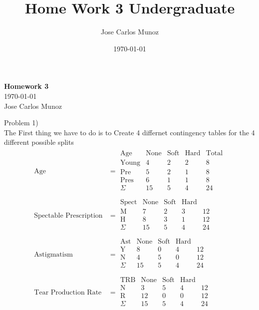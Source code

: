 \documentclass[12pt,english]{article}
\title{Home Work 3 Undergraduate}
\date{\today}
\author{Jose Carlos Munoz}
\begin{document}
\begin{center}
    \Large
    \textbf{Homework 3}\\
    \small
    \today\\
    \large
    Jose Carlos Munoz
\end{center}%
\par
Problem 1)\\
The First thing we have to do is to Create 4 differnet contingency tables for the 4 different possible splits
\begin{equation}\tag{1}\label{eq:1}
\begin{split}
\mbox{Age} &= 
\begin{array}{c|ccc|c}
\mbox{Age}   & \mbox{None} & \mbox{Soft} & \mbox{Hard} & \mbox{Total}\\
\hline
\mbox{Young} & 4           & 2           & 2           &  8\\
\mbox{Pre}   & 5           & 2           & 1           &  8\\
\mbox{Pres}  & 6           & 1           & 1           &  8\\
\hline
\Sigma       & 15          & 5           & 4           & 24\\
\end{array}
\\
\mbox{Spectable Prescription} &= 
\begin{array}{c|ccc|c}
\mbox{Spect} & \mbox{None} & \mbox{Soft} & \mbox{Hard} & \\
\hline
\mbox{M}     & 7           & 2           & 3           & 12\\
\mbox{H}     & 8           & 3           & 1           & 12\\
\hline
\Sigma       & 15          & 5           & 4           & 24\\
\end{array}
\\
\mbox{Astigmatism } &=
\begin{array}{c|ccc|c}
\mbox{Ast}   & \mbox{None} & \mbox{Soft} & \mbox{Hard} & \\
\hline
\mbox{Y}     & 8           & 0           & 4           & 12\\
\mbox{N}     & 4           & 5           & 0           & 12\\
\hline
\Sigma       & 15          & 5           & 4           & 24\\
\end{array}
\\
\mbox{Tear Production Rate} &=
\begin{array}{c|ccc|c}
\mbox{TRB}   & \mbox{None} & \mbox{Soft} & \mbox{Hard} & \\
\hline
\mbox{N}     & 3           & 5           & 4           & 12\\
\mbox{R}     & 12          & 0           & 0           & 12\\
\hline
\Sigma       & 15          & 5           & 4           & 24\\
\end{array}
\end{split}
\end{equation}
\end{document}
